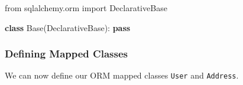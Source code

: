 \documentclass[
  letterpaper,
  DIV=11,
  numbers=noendperiod]{scrreprt}
\newenvironment{Shaded}{\begin{snugshade}}{\end{snugshade}}
\newcommand{\ControlFlowTok}[1]{\textcolor[rgb]{0.00,0.23,0.31}{\textbf{#1}}}
\newcommand{\ImportTok}[1]{\textcolor[rgb]{0.00,0.46,0.62}{#1}}
\newcommand{\KeywordTok}[1]{\textcolor[rgb]{0.00,0.23,0.31}{\textbf{#1}}}
\newcommand{\NormalTok}[1]{\textcolor[rgb]{0.00,0.23,0.31}{#1}}
\begin{document}
\begin{Shaded}
\begin{Highlighting}[]
\ImportTok{from}\NormalTok{ sqlalchemy.orm }\ImportTok{import}\NormalTok{ DeclarativeBase}

\KeywordTok{class}\NormalTok{ Base(DeclarativeBase):}
    \ControlFlowTok{pass}
\end{Highlighting}
\end{Shaded}

\subsubsection{Defining Mapped Classes}\label{defining-mapped-classes}

We can now define our ORM mapped classes \texttt{User} and
\texttt{Address}.
\end{document}
